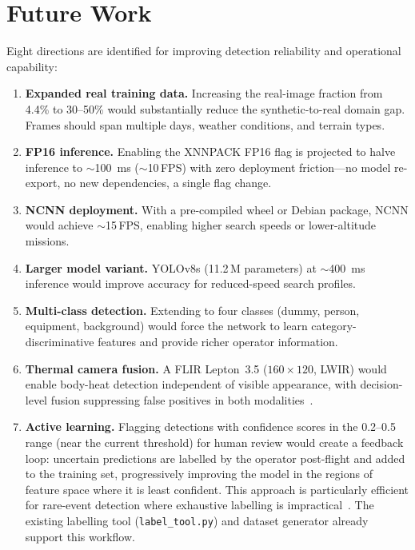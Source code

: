 \documentclass[10pt,a4paper]{article}
\begin{document}
\section{Future Work}\label{sec:future}

Eight directions are identified for improving detection reliability and operational capability:

\begin{enumerate}
    \item \textbf{Expanded real training data.} Increasing the real-image fraction from 4.4\% to 30--50\% would substantially reduce the synthetic-to-real domain gap. Frames should span multiple days, weather conditions, and terrain types.

    \item \textbf{FP16 inference.} Enabling the XNNPACK FP16 flag is projected to halve inference to ${\sim}$\SI{100}{\milli\second} (${\sim}$10\,FPS) with zero deployment friction---no model re-export, no new dependencies, a single flag change.

    \item \textbf{NCNN deployment.} With a pre-compiled wheel or Debian package, NCNN would achieve ${\sim}$15\,FPS, enabling higher search speeds or lower-altitude missions.

    \item \textbf{Larger model variant.} YOLOv8s (11.2\,M parameters) at ${\sim}$\SI{400}{\milli\second} inference would improve accuracy for reduced-speed search profiles.

    \item \textbf{Multi-class detection.} Extending to four classes (dummy, person, equipment, background) would force the network to learn category-discriminative features and provide richer operator information.

    \item \textbf{Thermal camera fusion.} A FLIR Lepton~3.5 ($160 \times 120$, LWIR) would enable body-heat detection independent of visible appearance, with decision-level fusion suppressing false positives in both modalities~\cite{rudol2008human}.

    \item \textbf{Active learning.} Flagging detections with confidence scores in the 0.2--0.5 range (near the current threshold) for human review would create a feedback loop: uncertain predictions are labelled by the operator post-flight and added to the training set, progressively improving the model in the regions of feature space where it is least confident. This approach is particularly efficient for rare-event detection where exhaustive labelling is impractical~\cite{settles2009active}. The existing labelling tool (\texttt{label\_tool.py}) and dataset generator already support this workflow.


\end{enumerate}
\end{document}
